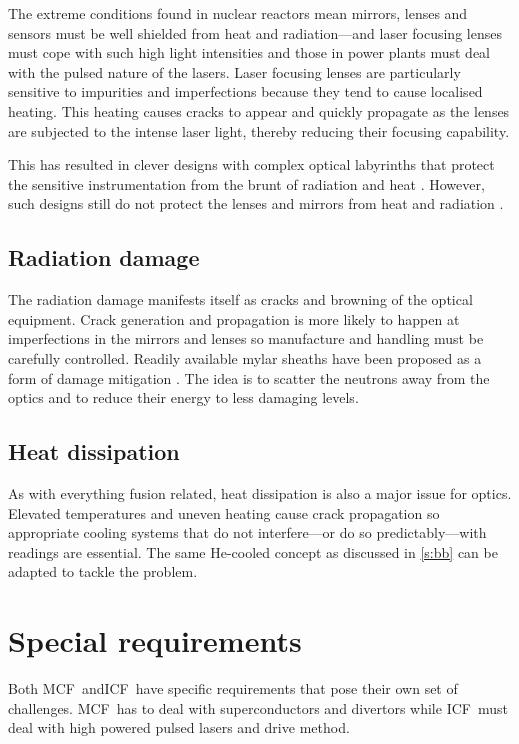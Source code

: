 \documentclass[12pt, a4paper]{article}
\newcommand{\mc}{MCF}
\newcommand{\ic}{ICF}
\begin{document}
		The extreme conditions found in nuclear reactors mean mirrors, lenses and sensors must be well shielded from heat and radiation---and laser focusing lenses must cope with such high light intensities and those in power plants must deal with the pulsed nature of the lasers. Laser focusing lenses are particularly sensitive to impurities and imperfections because they tend to cause localised heating. This heating causes cracks to appear and quickly propagate as the lenses are subjected to the intense laser light, thereby reducing their focusing capability.
		
		This has resulted in clever designs with complex optical labyrinths that protect the sensitive instrumentation from the brunt of radiation and heat \cite{optic1}. However, such designs still do not protect the lenses and mirrors from heat and radiation \cite{optic2}.
		\subsection{Radiation damage}
			The radiation damage manifests itself as cracks and browning of the optical equipment. Crack generation and propagation is more likely to happen at imperfections in the mirrors and lenses so manufacture and handling must be carefully controlled. Readily available mylar sheaths have been proposed as a form of damage mitigation \cite{mylar1}. The idea is to scatter the neutrons away from the optics and to reduce their energy to less damaging levels.
		\subsection{Heat dissipation}
			As with everything fusion related, heat dissipation is also a major issue for optics. Elevated temperatures and uneven heating cause crack propagation so appropriate cooling systems that do not interfere---or do so predictably---with readings are essential. The same He-cooled concept as discussed in \cref{s:bb} can be adapted to tackle the problem.
	\section{Special requirements}\label{s:sr}
		Both \mc~and\ic~have specific requirements that pose their own set of challenges. \mc~has to deal with superconductors and divertors while \ic~must deal with high powered pulsed lasers and drive method.
\end{document}
